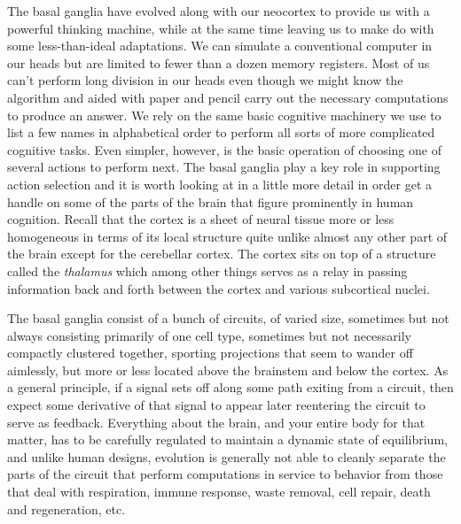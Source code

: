 \documentclass[letterpaper,11pt]{article}
\begin{document}
The basal ganglia have evolved along with our neocortex to provide us with a powerful thinking machine, while at the same time leaving us to make do with some less-than-ideal adaptations. We can simulate a conventional computer in our heads but are limited to fewer than a dozen memory registers. Most of us can't perform long division in our heads even though we might know the algorithm and aided with paper and pencil carry out the necessary computations to produce an answer. We rely on the same basic cognitive machinery we use to list a few names in alphabetical order to perform all sorts of more complicated cognitive tasks. Even simpler, however, is the basic operation of choosing one of several actions to perform next. The basal ganglia play a key role in supporting action selection and it is worth looking at in a little more detail in order get a handle on some of the parts of the brain that figure prominently in human cognition. Recall that the cortex is a sheet of neural tissue more or less homogeneous in terms of its local structure quite unlike almost any other part of the brain except for the cerebellar cortex. The cortex sits on top of a structure called the {\it{thalamus}} which among other things serves as a relay in passing information back and forth between the cortex and various subcortical nuclei.

The basal ganglia consist of a bunch of circuits, of varied size, sometimes but not always consisting primarily of one cell type, sometimes but not necessarily compactly clustered together, sporting projections that seem to wander off aimlessly, but more or less located above the brainstem and below the cortex. As a general principle, if a signal sets off along some path exiting from a circuit, then expect some derivative of that signal to appear later reentering the circuit to serve as feedback. Everything about the brain, and your entire body for that matter, has to be carefully regulated to maintain a dynamic state of equilibrium, and unlike human designs, evolution is generally not able to cleanly separate the parts of the circuit that perform computations in service to behavior from those that deal with respiration, immune response, waste removal, cell repair, death and regeneration, etc. 

\end{document}
